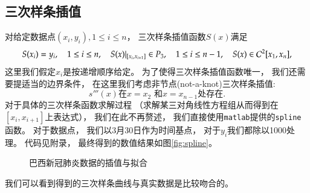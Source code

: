 \documentclass[a4paper]{article}
\let\mathbb\relax %
\begin{document}
\begin{CJK*}{UTF8}{gkai}
  \section{三次样条插值}
  对给定数据点$(x_i, y_i), 1\le i\le n$，
  三次样条插值函数$S(x)$满足
  \begin{displaymath}
    S(x_i)=y_i, \quad 1\le i \le n, \quad S(x)|_{[x_i, x_{i+1}]}\in\mathbb{P}_3, \quad 1\le i\le n-1, \quad S(x)\in\mathcal{C}^2[x_1, x_n],
  \end{displaymath}
  这里我们假定$x_i$是按递增顺序给定。
  为了使得三次样条插值函数唯一，
  我们还需要提适当的边界条件，
  在这里我们考虑非节点(not-a-knot)三次样条插值:
  \begin{displaymath}
    s'''(x) \text{在}x=x_2 \text{ 和} x=x_{n-1}\text{处存在}.
  \end{displaymath}
  对于具体的三次样条函数求解过程
  （求解某三对角线性方程组从而得到在$[x_i, x_{i+1}]$上表达式），
  我们在此不再赘述，
  我们直接使用\verb|matlab|提供的\verb|spline|函数。
  对于数据点，
  我们以3月30日作为时间基点，
  对于$y_i$我们都除以1000处理。
  代码见附录，
  最终得到的数值结果如图\ref{fig:spline}。
  \begin{figure}
    \centering
    \hfill
    \label{fig:data}
    \caption{巴西新冠肺炎数据的插值与拟合}
  \end{figure}
  我们可以看到得到的三次样条曲线与真实数据是比较吻合的。



\end{CJK*}
\end{document}
